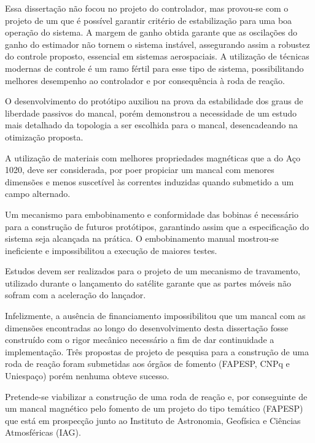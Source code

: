 Essa dissertação não focou no projeto do controlador, mas provou-se com o projeto de um que é possível garantir critério de estabilização para uma boa operação do sistema. A margem de ganho obtida garante que as oscilações do ganho do estimador não tornem o sistema instável, assegurando assim a robustez do controle proposto, essencial em sistemas aerospaciais. A utilização de técnicas modernas de controle é um ramo fértil para esse tipo de sistema, possibilitando melhores desempenho ao controlador e por consequência à roda de reação. 

O desenvolvimento do protótipo auxiliou na prova da estabilidade dos graus de liberdade passivos do mancal, porém demonstrou a necessidade de um estudo mais detalhado da topologia a ser escolhida para o mancal, desencadeando na otimização proposta.

A utilização de materiais com melhores propriedades magnéticas que a do Aço 1020, deve ser considerada, por poer propiciar um mancal com menores dimensões e menos suscetível às correntes induzidas \citep{Ravaud2009} quando submetido a um campo alternado.

Um mecanismo para embobinamento e conformidade das bobinas é necessário para a construção de futuros protótipos, garantindo assim que a especificação do sistema seja alcançada na prática. O embobinamento manual mostrou-se ineficiente e impossibilitou a execução de maiores testes. 

Estudos devem ser realizados para o projeto de um mecanismo de travamento, utilizado durante o lançamento do satélite garante que as partes móveis não sofram com a aceleração do lançador.

Infelizmente, a ausência de financiamento impossibilitou que um mancal com as dimensões encontradas ao longo do desenvolvimento desta dissertação fosse construído com o rigor mecânico necessário a fim de dar continuidade a implementação. Três propostas de projeto de pesquisa para a construção de uma roda de reação foram submetidas aos órgãos de fomento (FAPESP, CNPq e Uniespaço) porém nenhuma obteve sucesso. 

Pretende-se viabilizar a construção de uma roda de reação e, por conseguinte de um mancal magnético pelo fomento de um projeto do tipo temático (FAPESP) que está em prospecção junto ao Instituto de Astronomia, Geofísica e Ciências Atmosféricas (IAG).




